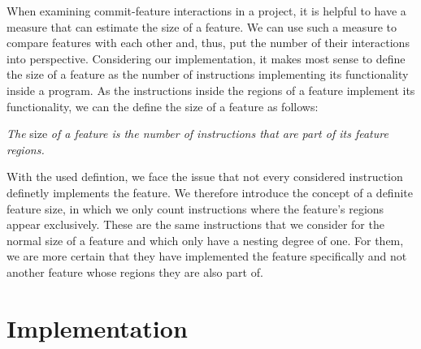 When examining commit-feature interactions in a project, it is helpful to have a measure that can estimate the size of a feature.
We can use such a measure to compare features with each other and, thus, put the number of their interactions into perspective.
Considering our implementation, it makes most sense to define the size of a feature as the number of instructions implementing its functionality inside a program.
As the instructions inside the regions of a feature implement its functionality, we can the define the size of a feature as follows:
\begin{definition} \label{def:feature_size}
\emph{The} size \emph{of a feature is the number of instructions that are part of its feature regions.}
\end{definition}
With the used defintion, we face the issue that not every considered instruction definetly implements the feature.
We therefore introduce the concept of a \textsf{definite} feature size, in which we only count instructions where the feature's regions appear exclusively.
These are the same instructions that we consider for the normal size of a feature and which only have a nesting degree of one.
For them, we are more certain that they have implemented the feature specifically and not another feature whose regions they are also part of.

\iffalse
It's possible to calculate the defined size of a feature by calculating the number of instructions in which structural CFIs occur.
That is, because every instruction that is part of a feature region accounts for a structural commit-feature interaction, as every instruction is part of exactly one commit region as shown in the beginning of this section.
It follows, that we do not miss any instructions that are part of feature regions and do not count any such instruction more than once. 
\fi

\section{Implementation}\label{ch:implementation}

